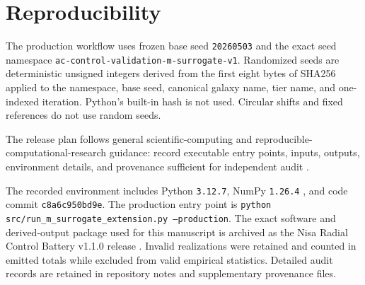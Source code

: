
\section{Reproducibility}
\label{sec:reproducibility}

The production workflow uses frozen base seed \texttt{20260503} and the exact
seed namespace \texttt{ac-control-validation-m-surrogate-v1}. Randomized seeds
are deterministic unsigned integers derived from the first eight bytes of
SHA256 applied to the namespace, base seed, canonical galaxy name, tier name,
and one-indexed iteration. Python's built-in hash is not used. Circular shifts
and fixed references do not use random seeds.

The release plan follows general scientific-computing and
reproducible-computational-research guidance: record executable entry points,
inputs, outputs, environment details, and provenance sufficient for independent
audit \citep{Wilson2014,Sandve2013}.

The recorded environment includes Python \texttt{3.12.7}, NumPy
\texttt{1.26.4} \citep{Harris2020}, and code commit \texttt{c8a6c950bd9e}. The production entry
point is \texttt{python src/\allowbreak run\_m\_surrogate\_extension.py
\allowbreak --production}.
The exact software and derived-output package used for this manuscript is archived as the Nisa Radial Control Battery v1.1.0 release \citep{Figueiredo_NRCB_2026}.
Invalid realizations were retained and counted in emitted totals while
excluded from valid empirical statistics. Detailed audit records are retained
in repository notes and supplementary provenance files.



